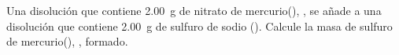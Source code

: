 Una disolución que contiene \SI{2,00}{\gram} de nitrato de mercurio(), , se añade a una disolución que contiene \SI{2,00}{\gram} de sulfuro de sodio (). Calcule la masa de sulfuro de mercurio(), , formado.